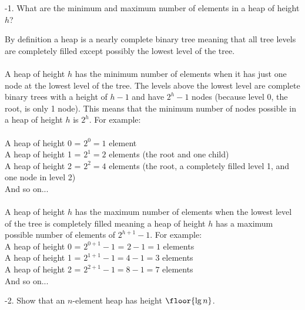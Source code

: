\documentclass[addpoints,11pt]{exam}
\begin{document}
%
%
\begin{questions}
-1.  What are the minimum and maximum number of elements in a heap of height $h$?

\begin{solutionorbox}
	By definition a heap is a nearly complete binary tree meaning that all tree levels are completely filled except possibly the lowest level of the tree. \\ \\
	A heap of height $h$ has the minimum number of elements when it has just one node at the lowest level of the tree. The levels above the lowest level are complete binary trees with a height of $h - 1$ and have $2^h - 1$ nodes (because level 0, the root, is only 1 node). This means that the minimum number of nodes possible in a heap of height $h$ is $2^h$. For example: \\ \\
	    A heap of height 0 = $2^0 = 1$ element\\
	    A heap of height 1 = $2^1 = 2$ elements (the root and one child)\\
	    A heap of height 2 = $2^2 = 4$ elements (the root, a completely filled level 1, and one node in level 2)\\ And so on... \\ \\
    A heap of height $h$ has the maximum number of elements when the lowest level of the tree is completely filled meaning a heap of height $h$ has a maximum possible number of elements of $2^{h+1} - 1$. For example: \\
        A heap of height 0 = $2^{0+1} - 1$ = $2 - 1 = 1$ elements \\ 
        A heap of height 1 = $2^{1+1} - 1 = 4 - 1 = 3$ elements \\ 
        A heap of height 2 = $2^{2+1} - 1 = 8 - 1 = 7$ elements \\And so on...
\end{solutionorbox}

\ifprintanswers
\newpage
\else
\bigskip
\fi


%
%
-2.  Show that an $n$-element heap has height $\floor{\lg n}$.


\end{questions}
\end{document}

